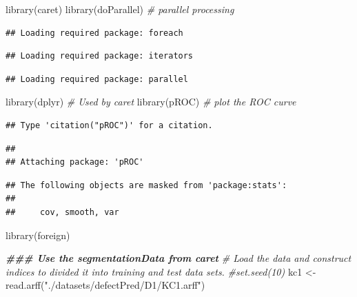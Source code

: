 \documentclass[
]{book}
\newenvironment{Shaded}{\begin{snugshade}}{\end{snugshade}}
\newcommand{\CommentTok}[1]{\textcolor[rgb]{0.56,0.35,0.01}{\textit{#1}}}
\newcommand{\DocumentationTok}[1]{\textcolor[rgb]{0.56,0.35,0.01}{\textbf{\textit{#1}}}}
\newcommand{\FunctionTok}[1]{\textcolor[rgb]{0.00,0.00,0.00}{#1}}
\newcommand{\NormalTok}[1]{#1}
\newcommand{\OtherTok}[1]{\textcolor[rgb]{0.56,0.35,0.01}{#1}}
\newcommand{\StringTok}[1]{\textcolor[rgb]{0.31,0.60,0.02}{#1}}
\begin{document}
\begin{Shaded}
\begin{Highlighting}[]
\FunctionTok{library}\NormalTok{(caret)}
\FunctionTok{library}\NormalTok{(doParallel) }\CommentTok{\# parallel processing}
\end{Highlighting}
\end{Shaded}

\begin{verbatim}
## Loading required package: foreach
\end{verbatim}

\begin{verbatim}
## Loading required package: iterators
\end{verbatim}

\begin{verbatim}
## Loading required package: parallel
\end{verbatim}

\begin{Shaded}
\begin{Highlighting}[]
\FunctionTok{library}\NormalTok{(dplyr) }\CommentTok{\# Used by caret}
\FunctionTok{library}\NormalTok{(pROC) }\CommentTok{\# plot the ROC curve}
\end{Highlighting}
\end{Shaded}

\begin{verbatim}
## Type 'citation("pROC")' for a citation.
\end{verbatim}

\begin{verbatim}
## 
## Attaching package: 'pROC'
\end{verbatim}

\begin{verbatim}
## The following objects are masked from 'package:stats':
## 
##     cov, smooth, var
\end{verbatim}

\begin{Shaded}
\begin{Highlighting}[]
\FunctionTok{library}\NormalTok{(foreign)}

\DocumentationTok{\#\#\# Use the segmentationData from caret}
\CommentTok{\# Load the data and construct indices to divided it into training and test data sets.}
\CommentTok{\#set.seed(10)}
\NormalTok{kc1 }\OtherTok{\textless{}{-}} \FunctionTok{read.arff}\NormalTok{(}\StringTok{"./datasets/defectPred/D1/KC1.arff"}\NormalTok{)}
\end{Highlighting}
\end{Shaded}
\end{document}
